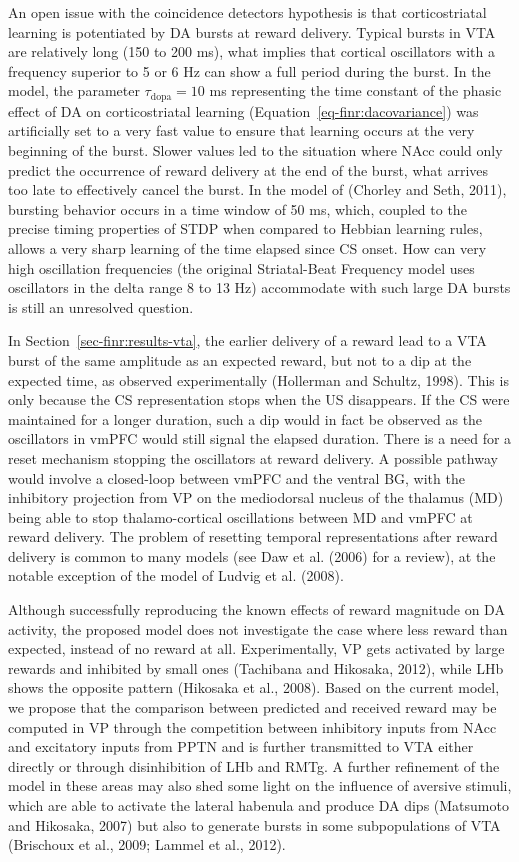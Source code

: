 \documentclass[
  11pt,
  a4paper,
]{scrbook}
\begin{document}
An open issue with the coincidence detectors hypothesis is that
corticostriatal learning is potentiated by DA bursts at reward delivery.
Typical bursts in VTA are relatively long (150 to 200 ms), what implies
that cortical oscillators with a frequency superior to 5 or 6 Hz can
show a full period during the burst. In the model, the parameter
\(\tau_{\text{dopa}}=10\) ms representing the time constant of the
phasic effect of DA on corticostriatal learning
(Equation~\ref{eq-finr:dacovariance}) was artificially set to a very
fast value to ensure that learning occurs at the very beginning of the
burst. Slower values led to the situation where NAcc could only predict
the occurrence of reward delivery at the end of the burst, what arrives
too late to effectively cancel the burst. In the model of (Chorley and
Seth, 2011), bursting behavior occurs in a time window of 50 ms, which,
coupled to the precise timing properties of STDP when compared to
Hebbian learning rules, allows a very sharp learning of the time elapsed
since CS onset. How can very high oscillation frequencies (the original
Striatal-Beat Frequency model uses oscillators in the delta range 8 to
13 Hz) accommodate with such large DA bursts is still an unresolved
question.

In Section~\ref{sec-finr:results-vta}, the earlier delivery of a reward
lead to a VTA burst of the same amplitude as an expected reward, but not
to a dip at the expected time, as observed experimentally (Hollerman and
Schultz, 1998). This is only because the CS representation stops when
the US disappears. If the CS were maintained for a longer duration, such
a dip would in fact be observed as the oscillators in vmPFC would still
signal the elapsed duration. There is a need for a reset mechanism
stopping the oscillators at reward delivery. A possible pathway would
involve a closed-loop between vmPFC and the ventral BG, with the
inhibitory projection from VP on the mediodorsal nucleus of the thalamus
(MD) being able to stop thalamo-cortical oscillations between MD and
vmPFC at reward delivery. The problem of resetting temporal
representations after reward delivery is common to many models (see Daw
et al. (2006) for a review), at the notable exception of the model of
Ludvig et al. (2008).

Although successfully reproducing the known effects of reward magnitude
on DA activity, the proposed model does not investigate the case where
less reward than expected, instead of no reward at all. Experimentally,
VP gets activated by large rewards and inhibited by small ones
(Tachibana and Hikosaka, 2012), while LHb shows the opposite pattern
(Hikosaka et al., 2008). Based on the current model, we propose that the
comparison between predicted and received reward may be computed in VP
through the competition between inhibitory inputs from NAcc and
excitatory inputs from PPTN and is further transmitted to VTA either
directly or through disinhibition of LHb and RMTg. A further refinement
of the model in these areas may also shed some light on the influence of
aversive stimuli, which are able to activate the lateral habenula and
produce DA dips (Matsumoto and Hikosaka, 2007) but also to generate
bursts in some subpopulations of VTA (Brischoux et al., 2009; Lammel et
al., 2012).
\end{document}
